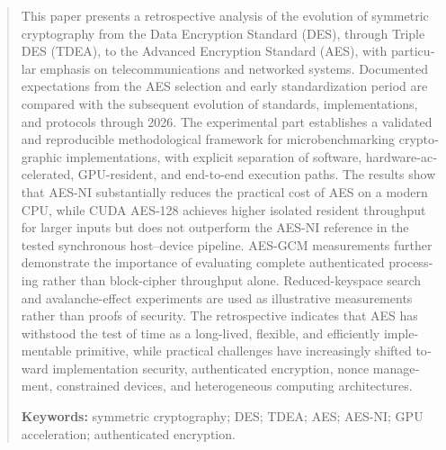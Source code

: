 \begin{otherlanguage}{english}
\begin{abstract}
This paper presents a retrospective analysis of the evolution of symmetric
cryptography from the Data Encryption Standard (DES), through Triple DES
(TDEA), to the Advanced Encryption Standard (AES), with particular emphasis
on telecommunications and networked systems. Documented expectations from
the AES selection and early standardization period are compared with the
subsequent evolution of standards, implementations, and protocols through
2026. The experimental part establishes a validated and reproducible
methodological framework for microbenchmarking cryptographic
implementations, with explicit separation of software, hardware-accelerated,
GPU-resident, and end-to-end execution paths. The results show that AES-NI
substantially reduces the practical cost of AES on a modern CPU, while
CUDA AES-128 achieves higher isolated resident throughput for larger
inputs but does not outperform the AES-NI reference in the tested
synchronous host--device pipeline. AES-GCM measurements further demonstrate
the importance of evaluating complete authenticated processing rather than
block-cipher throughput alone. Reduced-keyspace search and avalanche-effect
experiments are used as illustrative measurements rather than proofs of
security. The retrospective indicates that AES has withstood the test of
time as a long-lived, flexible, and efficiently implementable primitive,
while practical challenges have increasingly shifted toward implementation
security, authenticated encryption, nonce management, constrained devices,
and heterogeneous computing architectures.

\noindent\textbf{Keywords:} symmetric cryptography; DES; TDEA; AES;
AES-NI; GPU acceleration; authenticated encryption.
\end{abstract}
\end{otherlanguage}